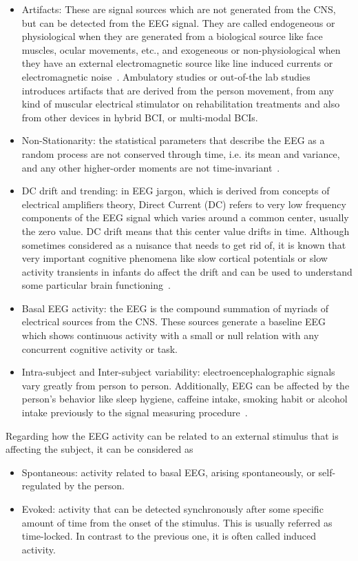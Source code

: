\begin{itemize}
\item Artifacts:  These are signal sources which are not generated from the CNS, but can be detected from the EEG signal.  They are called endogeneous or physiological when they are generated from a biological source like face muscles, ocular movements, etc., and exogeneous or non-physiological when they have an external electromagnetic source like line induced currents or electromagnetic noise~\cite{Weeda2012}.  Ambulatory studies or out-of-the lab studies introduces artifacts that are derived from the person movement, from any kind of muscular electrical stimulator on rehabilitation treatments and also from other devices in hybrid BCI, or multi-modal BCIs.
\item Non-Stationarity: the statistical parameters that describe the EEG as a random process are not conserved through time, i.e. its mean and variance, and any other higher-order moments are not time-invariant~\cite{Jansen1991}.
\item DC drift and trending: in EEG jargon, which is derived from concepts of electrical amplifiers theory, Direct Current (DC) refers to very low frequency components of the EEG signal which varies around a common center, usually the zero value.  DC drift means that this center value drifts in time.  Although sometimes considered as a nuisance that needs to get rid of, it is known that very important cognitive phenomena like slow cortical potentials or slow activity transients in infants do affect the drift and can be used to understand some particular brain functioning~\cite{Vanhatalo2005,Schomer2010}.
\item Basal EEG activity: the EEG is the compound summation of myriads of electrical sources from the CNS.  These sources generate a baseline EEG which shows continuous activity with a small or null relation with any concurrent cognitive activity or task.
\item Intra-subject and Inter-subject variability: electroencephalographic signals vary greatly from person to person.  Additionally, EEG can be affected by the person's behavior like sleep hygiene, caffeine intake, smoking habit or alcohol intake previously to the signal measuring procedure~\cite{Farzan2017}.
\end{itemize}

Regarding how the EEG activity can be related to an external stimulus that is affecting the subject, it can be considered as

\begin{itemize}
\item Spontaneous: activity related to basal EEG, arising spontaneously, or self-regulated by the person.
\item Evoked: activity that can be detected synchronously after some specific amount of time from the onset of the stimulus.  This is usually referred as time-locked.  In contrast to the previous one, it is often called induced activity.
\end{itemize}

